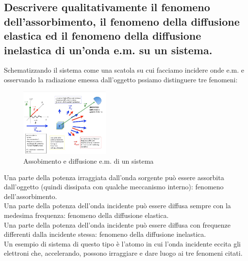 \subsection[]{ Descrivere qualitativamente il fenomeno dell'assorbimento, il fenomeno della diffusione elastica ed il fenomeno della diffusione inelastica di un'onda e.m. su un sistema.}
Schematizzando il sistema come una scatola su cui facciamo incidere onde e.m. e osservando la radiazione emessa dall'oggetto pssiamo distinguere tre fenomeni:
\begin{figure}[H]
	\centering
	\includegraphics[width=0.4\textwidth]{immagini/1.png}
	\caption{Assobimento e diffusione e.m. di un sistema}
	\label{fig:1}
\end{figure}
Una parte della potenza irraggiata dall'onda sorgente può essere assorbita dall'oggetto (quindi dissipata con qualche meccanismo interno): fenomeno dell'assorbimento.\\
Una parte della potenza dell'onda incidente può essere diffusa sempre con la medesima frequenza: fenomeno della diffusione elastica.\\
Una parte della potenza dell'onda incidente può essere diffusa con frequenze differenti dalla incidente stessa: fenomeno della diffusione inelastica.\\
Un esempio di sistema di questo tipo è l'atomo in cui l'onda incidente eccita gli elettroni che, accelerando, possono irraggiare e dare luogo ai tre fenomeni citati.

